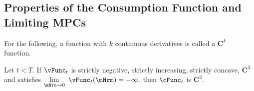 \documentclass[\econtexRoot/BufferStockTheory]{subfiles}
\begin{document}
\subsection{Properties of the Consumption Function and Limiting MPCs}\label{sec:MPCiterproofs}

For the following, a function with $k$ continuous derivatives is called a $\mathbf{C}^{k}$ function.


\begin{lemma}\label{lemm:consC2}
Let $t<T$.
If $\vFunc_{t}$ is strictly negative, strictly increasing, strictly concave, $\mathbf{C}^{3}$ and satisfies $\lim\limits_{\mNrm\rightarrow 0}~\vFunc_{t}(\mNrm) =-\infty $, then $\cFunc_{t}$ is $\mathbf{C}^{2}$.
\end{lemma}
\end{document}
